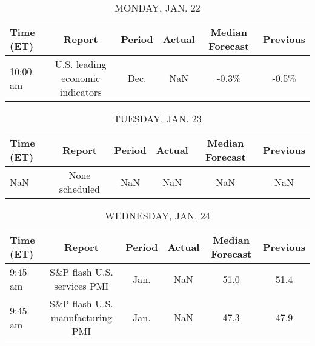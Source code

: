 \documentclass{article}%
\begin{document}
%
\normalsize%


\begin{table}[htbp]%
\caption{MONDAY, JAN. 22}%
\centering%
\begin{adjustbox}{width=1\textwidth}%
\begin{tabular}{lccccc}
\toprule
Time (ET) &                           Report & Period & Actual & Median Forecast & Previous \\
\midrule
 10:00 am & U.S. leading economic indicators &   Dec. &    NaN &           -0.3\% &    -0.5\% \\
\bottomrule
\end{tabular}
%
\end{adjustbox}%
\end{table}

%


\begin{table}[htbp]%
\caption{TUESDAY, JAN. 23}%
\centering%
\begin{adjustbox}{width=1\textwidth}%
\begin{tabular}{lccccc}
\toprule
Time (ET) &         Report & Period & Actual & Median Forecast & Previous \\
\midrule
      NaN & None scheduled &    NaN &    NaN &             NaN &      NaN \\
\bottomrule
\end{tabular}
%
\end{adjustbox}%
\end{table}

%


\begin{table}[htbp]%
\caption{WEDNESDAY, JAN. 24}%
\centering%
\begin{adjustbox}{width=1\textwidth}%
\begin{tabular}{lccccc}
\toprule
Time (ET) &                           Report & Period & Actual & Median Forecast & Previous \\
\midrule
  9:45 am &      S\&P flash U.S. services PMI &   Jan. &    NaN &            51.0 &     51.4 \\
  9:45 am & S\&P flash U.S. manufacturing PMI &   Jan. &    NaN &            47.3 &     47.9 \\
\bottomrule
\end{tabular}
%
\end{adjustbox}%
\end{table}

%
\end{document}
